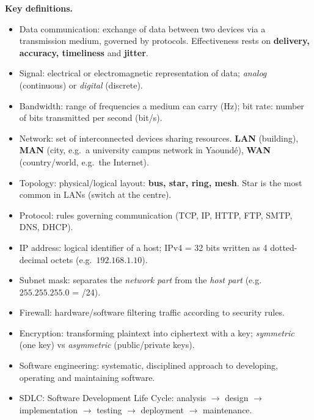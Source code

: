 \documentclass[11pt]{article}
\newcommand{\cle}[1]{{\popxbold\color{popdark}#1}}
\begin{document}
\begin{bilan}

\textbf{Key definitions.}
\begin{itemize}
\item \cle{Data communication}: exchange of data between two devices via a transmission medium, governed by protocols. Effectiveness rests on \textbf{delivery, accuracy, timeliness} and \textbf{jitter}.
\item \cle{Signal}: electrical or electromagnetic representation of data; \emph{analog} (continuous) or \emph{digital} (discrete).
\item \cle{Bandwidth}: range of frequencies a medium can carry (Hz); \cle{bit rate}: number of bits transmitted per second (bit/s).
\item \cle{Network}: set of interconnected devices sharing resources. \textbf{LAN} (building), \textbf{MAN} (city, e.g.\ a university campus network in Yaoundé), \textbf{WAN} (country/world, e.g.\ the Internet).
\item \cle{Topology}: physical/logical layout: \textbf{bus, star, ring, mesh}. Star is the most common in LANs (switch at the centre).
\item \cle{Protocol}: rules governing communication (TCP, IP, HTTP, FTP, SMTP, DNS, DHCP).
\item \cle{IP address}: logical identifier of a host; IPv4 = 32 bits written as 4 dotted-decimal octets (e.g.\ $192.168.1.10$).
\item \cle{Subnet mask}: separates the \emph{network part} from the \emph{host part} (e.g.\ $255.255.255.0$ = /24).
\item \cle{Firewall}: hardware/software filtering traffic according to security rules.
\item \cle{Encryption}: transforming plaintext into ciphertext with a key; \emph{symmetric} (one key) vs \emph{asymmetric} (public/private keys).
\item \cle{Software engineering}: systematic, disciplined approach to developing, operating and maintaining software.
\item \cle{SDLC}: Software Development Life Cycle: analysis $\rightarrow$ design $\rightarrow$ implementation $\rightarrow$ testing $\rightarrow$ deployment $\rightarrow$ maintenance.
\end{itemize}


\end{bilan}
\end{document}
